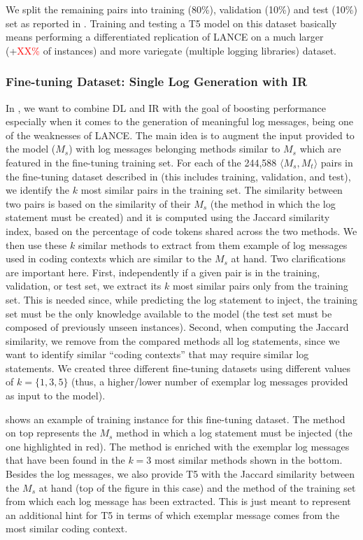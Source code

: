 We split the remaining pairs into training (80\%), validation (10\%) and test (10\%) set as reported in . Training and testing a T5 model on this dataset basically means performing a differentiated replication of LANCE on a much larger (+\textcolor{red}{XX\%} of instances) and more variegate (multiple logging libraries) dataset.

\subsubsection{Fine-tuning Dataset: Single Log Generation with IR} \label{sec:single-log-plus-IR}

In \approach, we want to combine DL and IR with the goal of boosting performance especially when it comes to the generation of meaningful log messages, being one of the weaknesses of LANCE. The main idea is to augment the input provided to the model (\ie $M_{s}$) with log messages belonging methods similar to $M_{s}$ which are featured in the fine-tuning training set. For each of the 244,588 $\langle M_s, M_t \rangle$ pairs in the fine-tuning dataset described in  (this includes training, validation, and test), we identify the $k$ most similar pairs in the training set. The similarity between two pairs is based on the similarity of their $M_s$ (\ie the method in which the log statement must be created) and it is computed using the Jaccard similarity \cite{hancock2004jaccard} index, based on the percentage of code tokens shared across the two methods. We then use these $k$ similar methods to extract from them example of log messages used in coding contexts which are similar to the $M_s$ at hand. Two clarifications are important here. First, independently if a given pair is in the training, validation, or test set, we extract its $k$ most similar pairs only from the training set. This is needed since, while predicting the log statement to inject, the training set must be the only knowledge available to the model (\ie the test set must be composed of previously unseen instances). Second, when computing the Jaccard similarity, we remove from the compared methods all log statements, since we want to identify similar ``coding contexts'' that may require similar log statements. We created three different fine-tuning datasets using different values of $k=\{1,3,5\}$ (thus, a higher/lower number of exemplar log messages provided as input to the model).




 shows an example of training instance for this fine-tuning dataset. The method on top represents the $M_{s}$ \java method in which a log statement must be injected (\ie the one highlighted in red). The method is enriched with the exemplar log messages that have been found in the $k=3$ most similar methods shown in the bottom. Besides the log messages, we also provide T5 with the Jaccard similarity between the $M_{s}$ at hand (top of the figure in this case) and the method of the training set from which each log message has been extracted. This is just meant to represent an additional hint for T5 in terms of which exemplar message comes from the most similar coding context.

